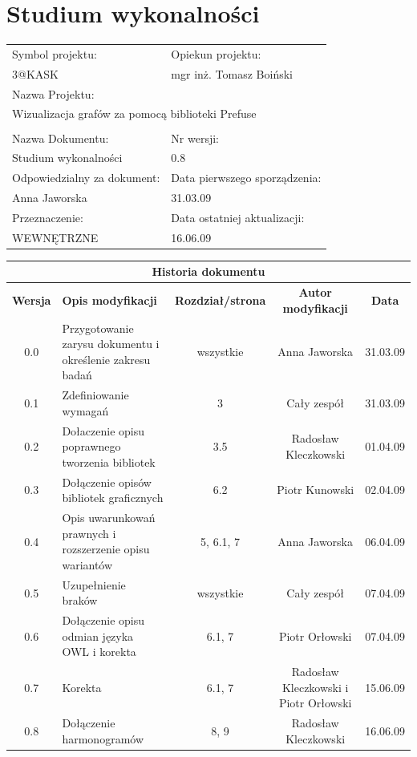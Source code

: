 

\section{Studium wykonalności}

\begin{center}
\begin{tabular}{|p{7cm}|p{7cm}|}
\hline
Symbol projektu: & Opiekun projektu:   \tabularnewline
3@KASK & mgr inż. Tomasz Boiński    \tabularnewline \hline
\multicolumn{2}{|l|}{Nazwa Projektu: } \tabularnewline
\multicolumn{2}{|l|}{Wizualizacja grafów za pomocą biblioteki Prefuse } \tabularnewline
\hline
\multicolumn{2}{l}{ } \tabularnewline %
\hline
Nazwa Dokumentu: & Nr wersji:   \tabularnewline
Studium wykonalności & 0.8 \tabularnewline \hline
Odpowiedzialny za dokument: & Data pierwszego sporządzenia:   \tabularnewline
Anna Jaworska & 31.03.09 \tabularnewline \hline
Przeznaczenie: & Data ostatniej aktualizacji:   \tabularnewline
WEWNĘTRZNE & 16.06.09 \tabularnewline \hline
\end{tabular}
\end{center}

\begin{center}
\begin{tabular}{|c|p{4cm}|c|c|c|}
\multicolumn{5}{c}{\textbf{Historia dokumentu}} \tabularnewline \hline
\textbf{Wersja} & \textbf{Opis modyfikacji} & \textbf{Rozdział/strona} & \textbf{Autor modyfikacji} & \textbf{Data} \tabularnewline \hline
0.0 & Przygotowanie zarysu dokumentu i określenie zakresu badań & wszystkie & Anna Jaworska & 31.03.09 \tabularnewline \hline
0.1 & Zdefiniowanie wymagań  & 3 & Cały zespół & 31.03.09  \tabularnewline \hline
0.2 & Dołaczenie opisu poprawnego tworzenia bibliotek & 3.5 & Radosław Kleczkowski & 01.04.09\tabularnewline \hline
0.3 & Dołączenie opisów bibliotek graficznych  & 6.2 & Piotr Kunowski & 02.04.09 \tabularnewline \hline
0.4 & Opis uwarunkowań prawnych i rozszerzenie opisu wariantów & 5, 6.1, 7 & Anna Jaworska & 06.04.09\tabularnewline \hline
0.5 & Uzupełnienie braków & wszystkie  & Cały zespół & 07.04.09 \tabularnewline \hline
0.6 & Dołączenie opisu odmian języka OWL i korekta & 6.1, 7  & Piotr Orłowski & 07.04.09 \tabularnewline \hline
0.7 & Korekta & 6.1, 7  & Radosław Kleczkowski i Piotr Orłowski & 15.06.09 \tabularnewline \hline
0.8 & Dołączenie harmonogramów & 8, 9  & Radosław Kleczkowski & 16.06.09 \tabularnewline \hline
\end{tabular}


\end{center}




